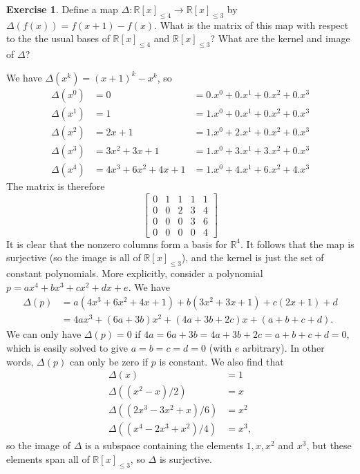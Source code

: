 \documentclass{amsart}
\newcommand{\R}         {{\mathbb{R}}}
\newcommand{\bsm}       {\left[\begin{smallmatrix}}
\newcommand{\esm}       {\end{smallmatrix}\right]}
\newcommand{\Dl}        {\Delta}
\renewcommand{\:}       {\colon}
\theoremstyle{definition}
\newtheorem{exercise}{Exercise}[section]
\renewenvironment{solution}{\SolutionAtEnd}{\endSolutionAtEnd}
\begin{document}
\begin{exercise}
 Define a map $\Dl\:\R[x]_{\leq 4}\to\R[x]_{\leq 3}$ by
 $\Dl(f(x))=f(x+1)-f(x)$.  What is the matrix of this map with
 respect to the the usual bases of $\R[x]_{\leq 4}$ and
 $\R[x]_{\leq 3}$?  What are the kernel and image of $\Dl$?
\end{exercise}
\begin{solution}
 We have $\Dl(x^k)=(x+1)^k-x^k$, so
 \begin{align*}
  \Dl(x^0) &= 0
           &= 0.x^0 + 0.x^1 + 0.x^2 + 0.x^3 \\
  \Dl(x^1) &= 1
           &= 1.x^0 + 0.x^1 + 0.x^2 + 0.x^3 \\
  \Dl(x^2) &= 2x+1
           &= 1.x^0 + 2.x^1 + 0.x^2 + 0.x^3 \\
  \Dl(x^3) &= 3x^2+3x+1
           &= 1.x^0 + 3.x^1 + 3.x^2 + 0.x^3 \\
  \Dl(x^4) &= 4x^3+6x^2+4x+1
           &= 1.x^0 + 4.x^1 + 6.x^2 + 4.x^3
 \end{align*}
 The matrix is therefore
 \[ \bsm
     0 & 1 & 1 & 1 & 1 \\
     0 & 0 & 2 & 3 & 4 \\
     0 & 0 & 0 & 3 & 6 \\
     0 & 0 & 0 & 0 & 4
    \esm
 \]
 It is clear that the nonzero columns form a basis for
 $\R^4$.  It follows that the map is surjective (so the
 image is all of $\R[x]_{\leq 3}$), and the kernel is just
 the set of constant polynomials.  More explicitly, consider
 a polynomial $p=ax^4+bx^3+cx^2+dx+e$.  We have 
 \begin{align*}
   \Dl(p) &= 
     a(4x^3+6x^2+4x+1)+ b(3x^2+3x+1) + 
     c(2x+1) + d \\
    &= 4ax^3 + (6a+3b)x^2 + (4a+3b+2c)x + (a+b+c+d).
 \end{align*}
 We can only have $\Dl(p)=0$ if
 $4a=6a+3b=4a+3b+2c=a+b+c+d=0$, which is easily solved to
 give $a=b=c=d=0$ (with $e$ arbitrary).  In other words,
 $\Dl(p)$ can only be zero if $p$ is constant.  We also find
 that 
 \begin{align*}
  \Dl(x) &= 1 \\
  \Dl((x^2-x)/2) &= x \\
  \Dl((2x^3-3x^2+x)/6) &= x^2 \\
  \Dl((x^4-2x^3+x^2)/4) &= x^3,
 \end{align*}
 so the image of $\Dl$ is a subspace containing the elements
 $1,x,x^2$ and $x^3$, but these elements span all of
 $\R[x]_{\leq 3}$, so $\Dl$ is surjective.  
\end{solution}
\end{document}
